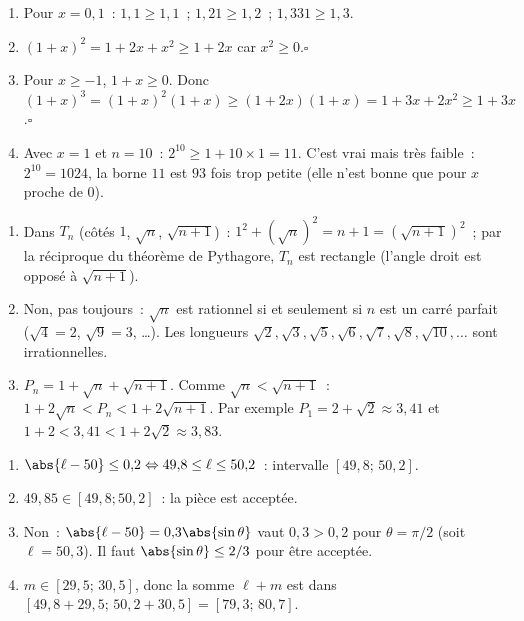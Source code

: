 \begin{enumerate}
  \item Pour $x=0{,}1$~: $1{,}1\ge1{,}1$~; $1{,}21\ge1{,}2$~; $1{,}331\ge1{,}3$.\checkmark
  \item $(1+x)^2=1+2x+x^2\ge1+2x$ car $x^2\ge0$.\hfill$\square$
  \item Pour $x\ge-1$, $1+x\ge0$. Donc $(1+x)^3=(1+x)^2(1+x)\ge(1+2x)(1+x)=1+3x+2x^2\ge1+3x$.\hfill$\square$
  \item Avec $x=1$ et $n=10$~: $2^{10}\ge1+10\times1=11$. C'est vrai mais tr\`es faible~: $2^{10}=1024$, la borne $11$ est $93$ fois trop petite (elle n'est bonne que pour $x$ proche de $0$).
\end{enumerate}
\begin{enumerate}
  \item Dans $T_n$ (c\^ot\'es $1$, $\sqrt n$, $\sqrt{n+1}$)~: $1^2+(\sqrt n)^2=n+1=(\sqrt{n+1})^2$~; par la r\'eciproque du th\'eor\`eme de Pythagore, $T_n$ est rectangle (l'angle droit est oppos\'e \`a $\sqrt{n+1}$).
  \item Non, pas toujours~: $\sqrt n$ est rationnel si et seulement si $n$ est un carr\'e parfait ($\sqrt4=2$, $\sqrt9=3$, \ldots). Les longueurs $\sqrt2,\sqrt3,\sqrt5,\sqrt6,\sqrt7,\sqrt8,\sqrt{10},\ldots$ sont irrationnelles.
  \item $P_n=1+\sqrt n+\sqrt{n+1}$. Comme $\sqrt n<\sqrt{n+1}$~: $1+2\sqrt n<P_n<1+2\sqrt{n+1}$.
        Par exemple $P_1=2+\sqrt2\approx3{,}41$ et $1+2<3{,}41<1+2\sqrt2\approx3{,}83$.
\end{enumerate}
\begin{enumerate}
  \item $\abs{\ell-50}\le0{,}2\Leftrightarrow49{,}8\le\ell\le50{,}2$~: intervalle $[49{,}8;\,50{,}2]$.
  \item $49{,}85\in[49{,}8;50{,}2]$~: la pi\`ece est accept\'ee.
  \item Non~: $\abs{\ell-50}=0{,}3\abs{\sin\theta}$ vaut $0{,}3>0{,}2$ pour $\theta=\pi/2$ (soit $\ell=50{,}3$). Il faut $\abs{\sin\theta}\le2/3$ pour \^etre accept\'ee.
  \item $m\in[29{,}5;\,30{,}5]$, donc la somme $\ell+m$ est dans $[49{,}8+29{,}5;\,50{,}2+30{,}5]=[79{,}3;\,80{,}7]$.
\end{enumerate}
